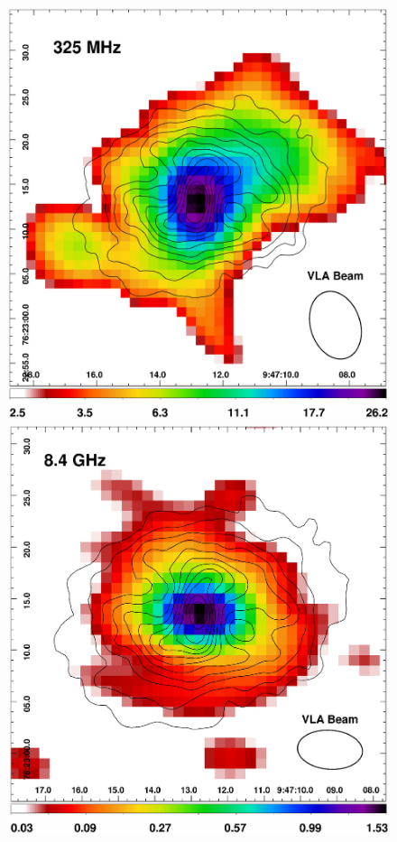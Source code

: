 \begin{figure}
  \begin{center}
    \begin{minipage}{0.495\linewidth}
      \includegraphics*[width=\textwidth, trim=0mm 0mm 0mm 0mm, clip]{arx_325.ps}
    \end{minipage}
   \begin{minipage}{0.495\linewidth}
      \includegraphics*[width=\textwidth, trim=0mm 0mm 0mm 0mm, clip]{arx_8.4.ps}

\end{minipage}
\end{center}
\end{figure}
